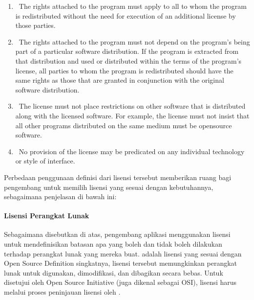 \documentclass[letterpaper,10pt,english]{sphinxmanual}
\begin{document}
\begin{enumerate}
\item {} 
  The rights attached to the program must apply to all to whom the program is redistributed without the need for execution of an additional license by those parties.

\item {} 
  The rights attached to the program must not depend on the program’s being part of a particular software distribution. If the program is extracted from that distribution and used or distributed within the terms of the program’s license, all parties to whom the program is redistributed should have the same rights as those that are granted in conjunction with the original software distribution.

\item {} 
  The license must not place restrictions on other software that is distributed along with the licensed software. For example, the license must not insist that all other programs distributed on the same medium must be open\sphinxhyphen{}source software.

\item {} 
  No provision of the license may be predicated on any individual technology or style of interface.

\end{enumerate}

Perbedaan penggunaan definisi dari lisensi tersebut memberikan ruang bagi pengembang untuk memilih lisensi yang sesuai dengan kebutuhannya, sebagaimana penjelasan di bawah ini:


\paragraph{Lisensi Perangkat Lunak}
\label{\detokenize{sesi1/fossgis:lisensi-perangkat-lunak}}
Sebagaimana disebutkan di atas, pengembang aplikasi menggunakan lisensi untuk mendefinisikan batasan apa yang boleh dan tidak boleh dilakukan terhadap perangkat lunak yang mereka buat.  adalah lisensi yang sesuai dengan Open Source Definition \sphinxhyphen{} singkatnya, lisensi tersebut memungkinkan perangkat lunak untuk digunakan, dimodifikasi, dan dibagikan secara bebas. Untuk disetujui oleh Open Source Initiative (juga dikenal sebagai OSI), lisensi harus melalui proses peninjauan lisensi oleh .
\end{document}
